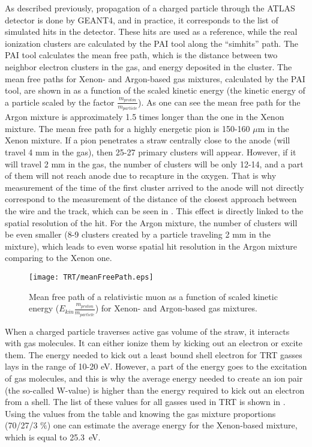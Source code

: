 As described previously, propagation of a charged particle through the ATLAS detector is done by GEANT4, and in practice, it corresponds to the list of simulated hits in the detector.
These hits are used as a reference, while the real ionization clusters are calculated by the PAI tool along the ``simhits'' path.
The PAI tool calculates the mean free path, which is the distance between two neighbor electron clusters in the gas, and energy deposited in the cluster. 
The mean free paths for Xenon- and Argon-based gas mixtures, calculated by the PAI tool, are shown in  as a function of the scaled kinetic energy 
(the kinetic energy of a particle scaled by the factor $\frac{m_{proton}}{m_{particle}}$). As one can see the mean free path for the Argon mixture is approximately 1.5 times longer than the one in the Xenon mixture.
The mean free path for a highly energetic pion is 150-160 $\mu$m in the Xenon mixture. If a pion penetrates a straw centrally close to the anode (will travel 4 mm in the gas), then 25-27 primary clusters will appear.
However, if it will travel 2 mm in the gas, the number of clusters will be only 12-14, and a part of them will not reach anode due to recapture in the oxygen. 
That is why measurement of the time of the first cluster arrived to the anode will not directly correspond to the measurement of the distance of the closest approach between the wire and the track, 
which can be seen in . This effect is directly linked to the spatial resolution of the hit.
For the Argon mixture, the number of clusters will be even smaller (8-9 clusters created by a particle traveling 2 mm in the mixture), which leads to even worse spatial hit resolution in the Argon mixture comparing 
to the Xenon one.

\begin{figure}
\centering
 \texttt{[image: TRT/meanFreePath.eps]}
\caption{Mean free path of a relativistic muon as a function of scaled kinetic energy ($E_{kin}\frac{m_{proton}}{m_{particle}}$) for Xenon- and Argon-based gas mixtures.}
\label{fig:meanFreePath}
\end{figure}

When a charged particle traverses active gas volume of the straw, it interacts with gas molecules.
It can either ionize them by kicking out an electron or excite them. The energy needed to kick out a least bound shell electron for TRT gasses lays
in the range of 10-20 eV. However, a part of the energy goes to the excitation of gas molecules, and this is why the average energy needed to create an ion pair (the so-called W-value) is higher than the energy required to kick out an electron from a shell. The list of these values for all gasses used in TRT is shown in .
Using the values from the table and knowing the gas mixture proportions (70/27/3 $\%$) one can estimate the average energy for the Xenon-based mixture, which is equal to 25.3~eV.

